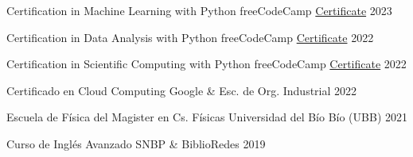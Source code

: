 

\begin{cvhonors}

  \cvhonor
    {Certification in Machine Learning with Python} %
    {freeCodeCamp} %
    {\href{https://www.freecodecamp.org/certification/_joacoh/machine-learning-with-python-v7}{Certificate}} %
    {2023} %

  \cvhonor
    {Certification in Data Analysis with Python} %
    {freeCodeCamp} %
    {\href{https://freecodecamp.org/certification/_joacoh/data-analysis-with-python-v7}{Certificate}} %
    {2022} %

  \cvhonor
    {Certification in Scientific Computing with Python} %
    {freeCodeCamp} %
    {\href{https://freecodecamp.org/certification/_joacoh/scientific-computing-with-python-v7}{Certificate}} %
    {2022} %

  \cvhonor
    {Certificado en Cloud Computing} %
    {Google \& Esc. de Org. Industrial} %
    {} %
    {2022} %

  \cvhonor
    {Escuela de Física del Magister en Cs. Físicas} %
    {Universidad del Bío Bío (UBB)} %
    {} %
    {2021} %

  \cvhonor
    {Curso de Inglés Avanzado} %
    {SNBP \& BiblioRedes} %
    {} %
    {2019} %

\end{cvhonors}
